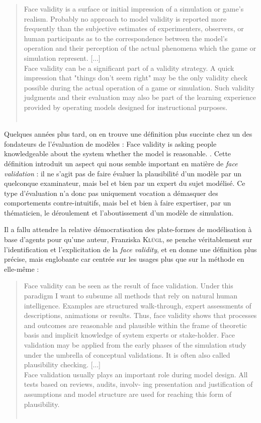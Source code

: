 \begin{quotation}
	\og Face validity is a surface or initial impression of a simulation or game's realism.
	Probably no approach to model validity is reported more frequently than the subjective estimates of experimenters, observers, or human participants as to the correspondence between the model's operation and their perception of the actual phenomena which the game or simulation represent.
	[...]\\
	Face validity can be a significant part of a validity strategy. A quick impression that "things don't seem right" may be the only validity check possible during the actual operation of a game or simulation. Such validity judgments and their evaluation may also be part of the learning experience provided by operating models designed for instructional purposes.\fg{}\\
	\mbox{}~ \hfill \cite[221]{hermann_validation_1967}
\end{quotation}

Quelques années plus tard, on en trouve une définition plus succinte chez un des fondateurs de l'évaluation de modèles : \og Face validity is asking people knowledgeable about the system whether the model is reasonable.\fg{} \autocite[500]{sargent_validation_1979}.
Cette définition introduit un aspect qui nous semble important en matière de \textit{face validation} : il ne s'agit pas de faire évaluer la plausibilité d'un modèle par un quelconque examinateur, mais bel et bien par un expert du sujet modélisé.
Ce type d'évaluation n'a donc pas uniquement vocation a démasquer des comportements contre-intuitifs, mais bel et bien à faire expertiser, par un thématicien, le déroulement et l'aboutissement d'un modèle de simulation.

Il a fallu attendre la relative démocratisation des plate-formes de modélisation à base d'agents pour qu'une auteur, Franziska K\textsc{lügl}, se penche véritablement sur l'identification et l'explicitation de la \textit{face validity}, et en donne une définition plus précise, mais englobante car centrée sur les usages plus que sur la méthode en elle-même :

\begin{quotation}
	\og Face validity can be seen as the result of face validation. Under this paradigm I want to subsume all methods that rely on natural human intelligence. Examples are structured walk-through, expert assessments of descriptions, animations or results. Thus, face validity shows that processes and outcomes are reasonable and plausible within the frame of theoretic basis and implicit knowledge of system experts or stake-holder. Face validation may be applied from the early phases of the simulation study under the umbrella of conceptual validations. It is often also called plausibility checking.
	[...]\\
	Face validation usually plays an important role during
	model design. All tests based on reviews, audits, involv-
	ing presentation and justification of assumptions and model
	structure are used for reaching this form of plausibility.
	\fg{}\\
	\mbox{}~ \hfill \cite[39;41]{klugl_validation_2008}
\end{quotation}


